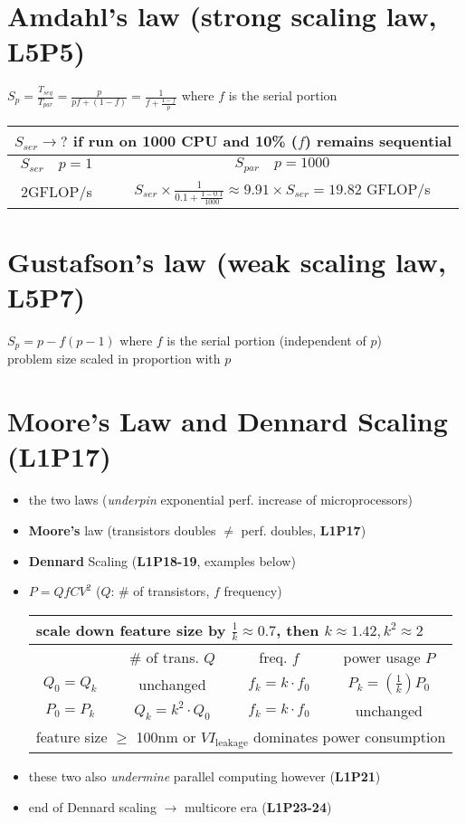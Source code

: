 \section*{Amdahl's law (strong scaling law, \textbf{L5P5})}
\(S_p = \frac{T_{seq}}{T_{par}} = \frac{p}{pf + (1-f)} = \frac{1}{f + \frac{1-f}{p}}\)  where $f$ is the serial portion
\begin{tabular}{c|c}
  \hline
  \multicolumn{2}{l}{$S_{ser} \rightarrow ? $ if run on 1000 CPU and 10\% ($f$) remains sequential} \\
  \hline
  $S_{ser} \quad p = 1$ & $S_{par} \quad p = 1000$  \\
  \hline
  2GFLOP/s  & $S_{ser} \times \frac{1}{0.1 + \frac{1-0.1}{1000}} \approx 9.91 \times S_{ser} = 19.82$ GFLOP/s \\
  \hline
\end{tabular}

\section*{Gustafson's law (weak scaling law, \textbf{L5P7})}
\(S_p = p - f(p-1)\) where $f$ is the serial portion (independent of $p$)\\
problem size scaled in proportion with $p$
\section*{Moore's Law and Dennard Scaling (\textbf{L1P17})}

\begin{itemize}
  \item the two laws (\emph{underpin} exponential perf. increase of microprocessors)
  \item \textbf{Moore's} law (transistors doubles $\ne$ perf. doubles, \textbf{L1P17})
  \item \textbf{Dennard} Scaling (\textbf{L1P18-19}, examples below)
  \item[] $P = QfCV^{2}$ ($Q$: \# of transistors, $f$ frequency)
  \begin{tabular}{c|ccc}
    \hline
    \multicolumn{4}{l}{scale down feature size by  $\frac{1}{k}\approx 0.7$, then $k\approx 1.42, k^{2}\approx 2$} \\
    \hline
    & \# of trans. $Q$ & freq. $f$ & power usage $P$  \\
    \hline
    $Q_{0} = Q_{k}$ & unchanged & $f_k = k \cdot f_0$ & $P_k = (\frac{1}{k})P_0$\\
    $P_{0} = P_{k}$ & $Q_k = k^{2} \cdot Q_0$ & $f_k = k \cdot f_0$ & unchanged  \\
    \hline
    \multicolumn{4}{l}{feature size $\geq$ 100nm or $VI_{\text{leakage}}$  dominates power consumption} \\
    \hline
  \end{tabular}
\item these two also \emph{undermine} parallel computing however (\textbf{L1P21})
\item end of Dennard scaling $\rightarrow$ multicore era (\textbf{L1P23-24})
\end{itemize}

